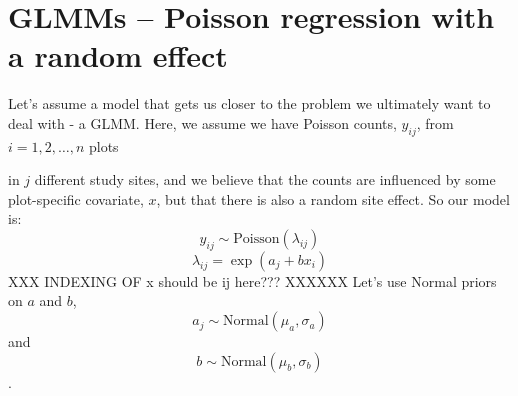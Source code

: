 \section{ GLMMs – Poisson regression with a random effect }

Let's assume a model that gets us closer to the problem we ultimately
want to deal with - a GLMM. Here, we assume we have Poisson counts,
$y_{ij}$, from $i=1,2,\ldots,n$ plots  in $j$ different study sites, and we believe that the counts are influenced by some plot-specific covariate, $x$, but that there is also a random site effect. So our model is:
\[
y_{ij} \sim \mbox{Poisson}(\lambda_{ij})
\]
\[
\lambda_{ij} = \exp (a_j + bx_i)
\]
XXX INDEXING OF x should be ij here??? XXXXXX
Let's use Normal priors on $a$ and $b$,  \[
a_j \sim \mbox{Normal} (\mu_a, \sigma_a)
\]
and
\[
b \sim \mbox{Normal} (\mu_b, \sigma_b)
\].

